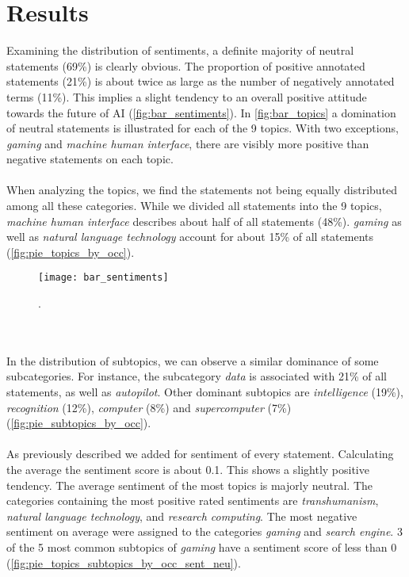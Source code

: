 \section{Results}
\label{results}
Examining the distribution of sentiments, a definite majority of neutral statements  (69\%) is clearly obvious. The proportion of positive annotated statements (21\%) is about twice as large as the number of negatively annotated terms (11\%). This implies a slight tendency to an overall positive attitude towards the future of AI (\autoref{fig:bar_sentiments}). In \autoref{fig:bar_topics} a domination of neutral statements is illustrated for each of the 9 topics. With two exceptions, \emph{gaming} and \emph{machine human interface}, there are visibly more positive than negative statements on each topic.
\\
\\
When analyzing the topics, we find the statements not being equally distributed among all these categories.
While we divided all statements into the 9 topics, \emph{machine human interface} describes about half of all statements (48\%).
\emph{gaming} as well as \emph{natural language technology} account for about 15\% of all statements (\autoref{fig:pie_topics_by_occ}).
\begin{figure}[t]
    \centering
    \texttt{[image: bar\_sentiments]}
    \caption{
        .
    }
    \label{fig:bar_sentiments}
\end{figure}
\\
\\
In the distribution of subtopics, we can observe a similar dominance of some subcategories. For instance, the subcategory \emph{data} is associated with 21\% of all statements, as well as \emph{autopilot}. Other dominant subtopics are \emph{intelligence} (19\%), \emph{recognition} (12\%), \emph{computer} (8\%) and \emph{supercomputer} (7\%) (\autoref{fig:pie_subtopics_by_occ}).
\\
\\
As previously described we added for sentiment of every statement.
Calculating the average the sentiment score is about 0.1.
This shows a slightly positive tendency.
The average sentiment of the most topics is majorly neutral.
The categories containing the most positive rated sentiments are \emph{transhumanism}, \emph{natural language technology}, and \emph{research computing}. The most negative sentiment on average were assigned to the categories \emph{gaming} and \emph{search engine}. 3 of the 5 most common subtopics of \emph{gaming} have a sentiment score of less than 0 (\autoref{fig:pie_topics_subtopics_by_occ_sent_neu}).
